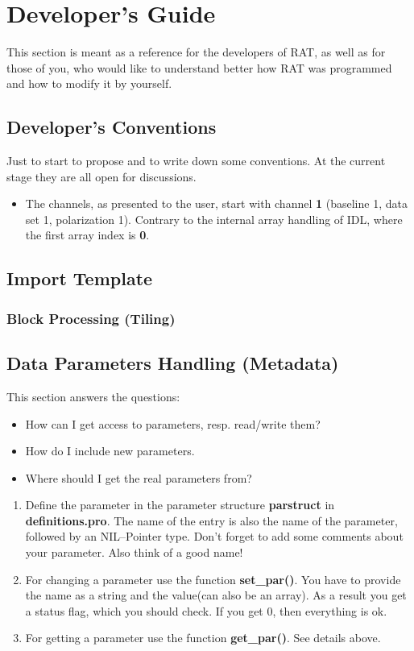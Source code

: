 \chapter{Developer's Guide}

This section is meant as a reference for the developers of RAT, as well as for
those of you, who would like to understand better how RAT was programmed and how
to modify it by yourself.


\section{Developer's Conventions}
Just to start to propose and to write down some conventions. At the current
stage they are all open for discussions.
\begin{itemize}
\item The channels, as presented to the user, start with channel \textbf{1} (baseline 1,
  data set 1, polarization 1). Contrary to the internal array handling of IDL,
  where the first array index is \textbf{0}.
\end{itemize}



\section{Import Template}

\subsection{Block Processing (Tiling)}

\section{Data Parameters Handling (Metadata)}
This section answers the questions:
\begin{itemize}
  \item How can I get access to parameters, resp. read/write them?
  \item How do I include new parameters.
  \item Where should I get the real parameters from?
\end{itemize}

\begin{enumerate}
  \item Define the parameter in the parameter structure \textbf{parstruct} in
    \textbf{definitions.pro}. The name of the entry is also the name of the
    parameter, followed by an NIL--Pointer type. Don't forget to add some
    comments about your parameter. Also think of a good name!
  \item For changing a parameter use the function \textbf{set\_par()}. You have to
    provide the name as a string and the value(can also be an array). As a
    result you get a status flag, which you should check. If you get 0, then
    everything is ok.
  \item For getting a parameter use the function \textbf{get\_par()}. See details above.
\end{enumerate}


